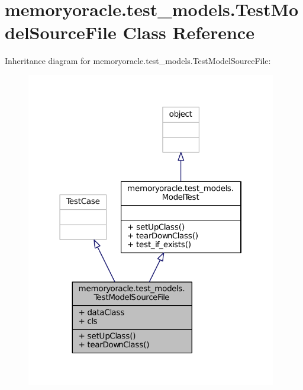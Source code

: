 \hypertarget{classmemoryoracle_1_1test__models_1_1TestModelSourceFile}{}\section{memoryoracle.\+test\+\_\+models.\+Test\+Model\+Source\+File Class Reference}
\label{classmemoryoracle_1_1test__models_1_1TestModelSourceFile}


Inheritance diagram for memoryoracle.\+test\+\_\+models.\+Test\+Model\+Source\+File\+:\nopagebreak
\begin{figure}[H]
\begin{center}
\leavevmode
\includegraphics[width=310pt]{classmemoryoracle_1_1test__models_1_1TestModelSourceFile__inherit__graph}
\end{center}
\end{figure}


